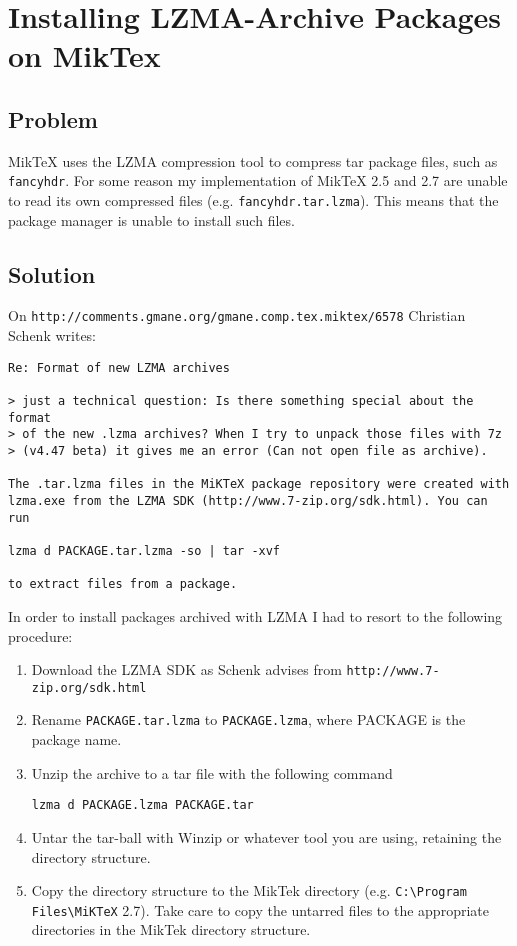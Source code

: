
\chapter{Installing LZMA-Archive  Packages on MikTex}
\label{sec:miktexpackages}

\section{Problem}

MikTeX uses the LZMA compression tool to compress tar package files, such as \verb"fancyhdr".  For some reason my implementation of MikTeX 2.5 and 2.7 are unable to read its own compressed files (e.g. \verb"fancyhdr.tar.lzma"). This means that the package manager is unable to install such files.


\section{Solution}

On
\verb"http://comments.gmane.org/gmane.comp.tex.miktex/6578"
 Christian Schenk writes:
{\small
\begin{verbatim}
Re: Format of new LZMA archives

> just a technical question: Is there something special about the format
> of the new .lzma archives? When I try to unpack those files with 7z
> (v4.47 beta) it gives me an error (Can not open file as archive).

The .tar.lzma files in the MiKTeX package repository were created with
lzma.exe from the LZMA SDK (http://www.7-zip.org/sdk.html). You can run

lzma d PACKAGE.tar.lzma -so | tar -xvf

to extract files from a package.
\end{verbatim}
}

In order to install packages archived with LZMA I had to resort to the following procedure:

\begin{enumerate}
\item
Download the LZMA SDK as Schenk advises from \verb"http://www.7-zip.org/sdk.html"

\item
Rename \verb"PACKAGE.tar.lzma" to \verb"PACKAGE.lzma", where PACKAGE is the package name.

\item
Unzip the archive to a tar file with the following command

\verb"lzma d PACKAGE.lzma PACKAGE.tar"

\item
Untar the tar-ball with  Winzip or whatever tool you are using, retaining the directory structure.

\item
Copy the directory structure to the MikTek directory (e.g. \verb"C:\Program Files\MiKTeX" 2.7). Take care to copy the untarred files to the appropriate directories in the MikTek directory structure.


\end{enumerate}


